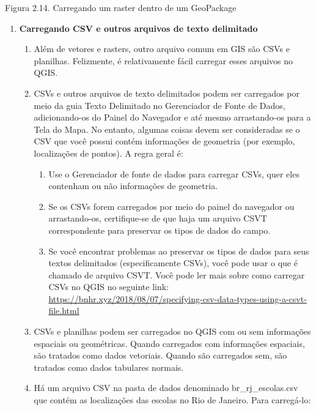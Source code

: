 \documentclass[
]{krantz}
\providecommand{\tightlist}{%
  \setlength{\itemsep}{0pt}\setlength{\parskip}{0pt}}
\begin{document}
Figura 2.14. Carregando um raster dentro de um GeoPackage

\begin{enumerate}
\def\labelenumi{\arabic{enumi}.}
\setcounter{enumi}{3}
\item
  \textbf{Carregando CSV e outros arquivos de texto delimitado}

  \begin{enumerate}
  \def\labelenumii{\arabic{enumii}.}
  \item
    Além de vetores e rasters, outro arquivo comum em GIS são CSVs e planilhas. Felizmente, é relativamente fácil carregar esses arquivos no QGIS.
  \item
    CSVs e outros arquivos de texto delimitados podem ser carregados por meio da guia Texto Delimitado no Gerenciador de Fonte de Dados, adicionando-os do Painel do Navegador e até mesmo arrastando-os para a Tela do Mapa. No entanto, algumas coisas devem ser consideradas se o CSV que você possui contém informações de geometria (por exemplo, localizações de pontos). A regra geral é:

    \begin{enumerate}
    \def\labelenumiii{\arabic{enumiii}.}
    \tightlist
    \item
      Use o Gerenciador de fonte de dados para carregar CSVs, quer eles contenham ou não informações de geometria.
    \item
      Se os CSVs forem carregados por meio do painel do navegador ou arrastando-os, certifique-se de que haja um arquivo CSVT correspondente para preservar os tipos de dados do campo.
    \item
      Se você encontrar problemas ao preservar os tipos de dados para seus textos delimitados (especificamente CSVs), você pode usar o que é chamado de arquivo CSVT. Você pode ler mais sobre como carregar CSVs no QGIS no seguinte link: \href{https:\%20//bnhr.xyz/2018/08/07/specifying-csv-data-types-using-a-csvt-file.html}{https://bnhr.xyz/2018/08/07/specifying-csv-data-types-using-a-csvt-file.html}
    \end{enumerate}
  \item
    CSVs e planilhas podem ser carregados no QGIS com ou sem informações espaciais ou geométricas. Quando carregados com informações espaciais, são tratados como dados vetoriais. Quando são carregados sem, são tratados como dados tabulares normais.
  \item
    Há um arquivo CSV na pasta de dados denominado br\_rj\_escolas.csv que contém as localizações das escolas no Rio de Janeiro. Para carregá-lo:


\end{enumerate}
\end{enumerate}
\end{document}
